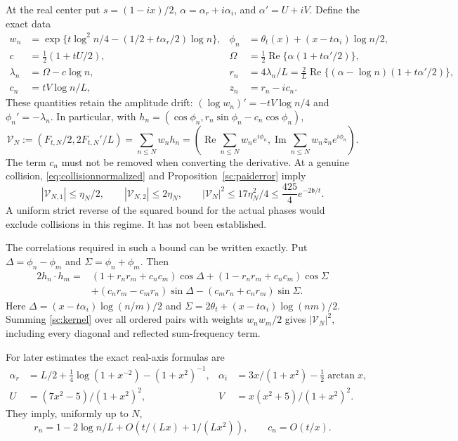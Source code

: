 \documentclass[11pt]{article}
\numberwithin{equation}{section}
\theoremstyle{definition}
\theoremstyle{remark}
\DeclareMathOperator{\Rea}{Re}
\DeclareMathOperator{\Ima}{Im}
\begin{document}
At the real center put $s=(1-ix)/2$, $\alpha=\alpha_r+i\alpha_i$,
and $\alpha'=U+iV$. Define the exact data
\begin{align}\label{sc:coefficients}
 w_n&=\exp\{t\log^2n/4-(1/2+t\alpha_r/2)\log n\},&
 \phi_n&=\theta_t(x)+(x-t\alpha_i)\log n/2,\\
 c&=\tfrac12(1+tU/2),&
 \Omega&=\tfrac12\Rea\{\alpha(1+t\alpha'/2)\},\nonumber\\
 \lambda_n&=\Omega-c\log n,&
 r_n&=4\lambda_n/L
      =\tfrac2L\Rea\{(\alpha-\log n)(1+t\alpha'/2)\},\nonumber\\
 c_n&=tV\log n/L,& z_n&=r_n-ic_n.\nonumber
\end{align}
These quantities retain the amplitude drift:
$(\log w_n)'=-tV\log n/4$ and $\phi_n'=-\lambda_n$.
In particular, with $h_n=(\cos\phi_n,r_n\sin\phi_n-c_n\cos\phi_n)$,
\begin{equation}\label{sc:vector}
 \mathcal V_N:=\left(F_{t,N}/2,2F_{t,N}'/L\right)
 =\sum_{n\le N}w_nh_n
 =\left(\Rea\sum_{n\le N}w_ne^{i\phi_n},
         \Ima\sum_{n\le N}w_nz_ne^{i\phi_n}\right).
\end{equation}
The term $c_n$ must not be removed when converting the derivative.
At a genuine collision, \eqref{eq:collisionnormalized} and
Proposition~\ref{sc:paiderror} imply
\begin{equation}\label{sc:collision}
 |\mathcal V_{N,1}|\le\eta_N/2,\qquad
 |\mathcal V_{N,2}|\le2\eta_N,\qquad
 |\mathcal V_N|^2\le17\eta_N^2/4
       \le\frac{425}{4}e^{-2\mathfrak b/t}.
\end{equation}
A uniform strict reverse of the squared bound for the actual phases would
exclude collisions in this regime. It has not been established.

The correlations required in such a bound can be written exactly. Put
$\Delta=\phi_n-\phi_m$ and $\Sigma=\phi_n+\phi_m$. Then
\begin{align}\label{sc:kernel}
 2h_n\cdot h_m={}&(1+r_nr_m+c_nc_m)\cos\Delta
 +(1-r_nr_m+c_nc_m)\cos\Sigma\nonumber\\
 &+(c_nr_m-c_mr_n)\sin\Delta
 -(c_mr_n+c_nr_m)\sin\Sigma.
\end{align}
Here $\Delta=(x-t\alpha_i)\log(n/m)/2$ and
$\Sigma=2\theta_t+(x-t\alpha_i)\log(nm)/2$.
Summing \eqref{sc:kernel} over all ordered pairs with weights $w_nw_m/2$
gives $|\mathcal V_N|^2$, including every diagonal and reflected
sum-frequency term.

For later estimates the exact real-axis formulas are
\begin{align}\label{sc:realaxis}
 \alpha_r&=L/2+\tfrac14\log(1+x^{-2})-(1+x^2)^{-1},&
 \alpha_i&=3x/(1+x^2)-\tfrac12\arctan x,\\
 U&=(7x^2-5)/(1+x^2)^2,&
 V&=x(x^2+5)/(1+x^2)^2.\nonumber
\end{align}
They imply, uniformly up to $N$,
\begin{equation}\label{sc:coordinateasymptotics}
 r_n=1-2\log n/L+O(t/(Lx)+1/(Lx^2)),\qquad c_n=O(t/x).
\end{equation}
\end{document}
